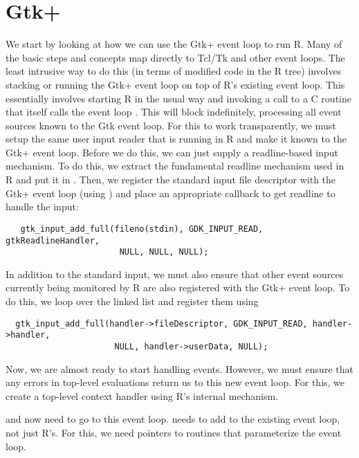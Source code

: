 \documentclass{article}
\begin{document}
\section{Gtk+}

We start by looking at how we can use the Gtk+ event loop to run R.
Many of the basic steps and concepts map directly to Tcl/Tk and
other event loops.
The least intrusive way to do this (in terms of modified code in the R
tree) involves stacking or running the Gtk+ event loop on top of R's
existing event loop. This essentially involves starting R in the usual
way and invoking a call to a C routine that itself calls the 
event loop .  This will block indefinitely,
processing all event sources known to the Gtk event loop.  For this to
work transparently, we must setup the same user input reader that is
running in R and make it known to the Gtk+ event loop.
Before we do this, we can just supply
a readline-based input mechanism.  To do this, we extract the
fundamental readline mechanism used in R and put it in
. Then, we register the standard input file
descriptor with the Gtk+ event loop (using
) and place an appropriate callback to
get readline to handle the input:
\begin{verbatim}
   gtk_input_add_full(fileno(stdin), GDK_INPUT_READ, gtkReadlineHandler, 
                       NULL, NULL, NULL);
\end{verbatim}

In addition to the standard input, we must also ensure that other
event sources currently being monitored by R are also registered with
the Gtk+ event loop. To do this, we loop over the 
linked list and register them using
\begin{verbatim}
  gtk_input_add_full(handler->fileDescriptor, GDK_INPUT_READ, handler->handler, 
                      NULL, handler->userData, NULL);
\end{verbatim}


Now, we are almost ready to start handling events.  However, we must
ensure that any errors in top-level evaluations return us to this new
event loop.  For this, we create a top-level context handler using R's
internal mechanism.


 and  now need to go to
this event loop.   needs to add to the
existing event loop, not just R's.  For this, we need pointers to
routines that parameterize the event loop.
\end{document}
